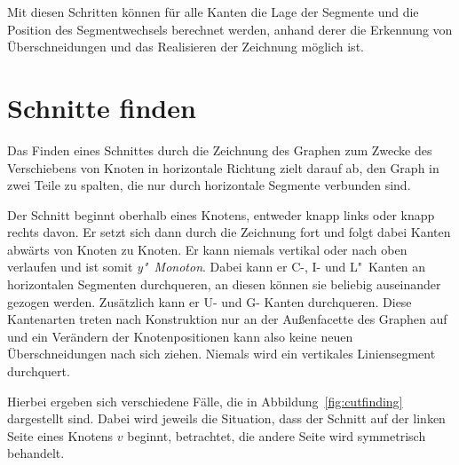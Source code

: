 \documentclass[a4paper]{scrreprt}
\theoremstyle{definition}
\begin{document}
Mit diesen Schritten können für alle Kanten die Lage der Segmente und die Position des Segmentwechsels berechnet werden, anhand derer die Erkennung von Überschneidungen und das Realisieren der Zeichnung möglich ist.

\section{Schnitte finden}
\label{sec:cutfinding}

Das Finden eines Schnittes durch die Zeichnung des Graphen zum Zwecke des Verschiebens von Knoten in horizontale Richtung zielt darauf ab, den Graph in zwei Teile zu spalten, die nur durch horizontale Segmente verbunden sind. 

Der Schnitt beginnt oberhalb eines Knotens, entweder knapp links oder knapp rechts davon. Er setzt sich dann durch die Zeichnung fort und folgt dabei Kanten abwärts von Knoten zu Knoten. Er kann niemals vertikal oder nach oben verlaufen und ist somit \emph{y"~Monoton}. Dabei kann er C-, I- und L"~Kanten an horizontalen Segmenten durchqueren, an diesen können sie beliebig auseinander gezogen werden. Zusätzlich kann er U- und G- Kanten durchqueren. Diese Kantenarten treten nach Konstruktion nur an der Außenfacette des Graphen auf und ein Verändern der Knotenpositionen kann also keine neuen Überschneidungen nach sich ziehen. Niemals wird ein vertikales Liniensegment durchquert.

Hierbei ergeben sich verschiedene Fälle, die in Abbildung~\ref{fig:cutfinding} dargestellt sind. Dabei wird jeweils die Situation, dass der Schnitt auf der linken Seite eines Knotens $v$ beginnt, betrachtet, die andere Seite wird symmetrisch behandelt. 
\end{document}
